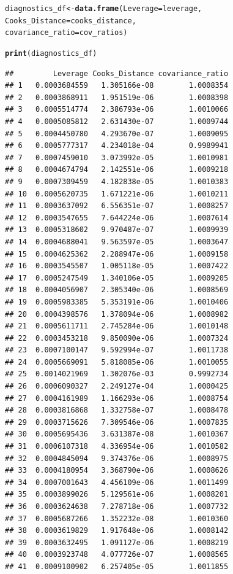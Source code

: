 \documentclass{article}\usepackage[]{graphicx}\usepackage[]{xcolor}
\makeatletter
\newcommand{\hlstd}[1]{\textcolor[rgb]{0.345,0.345,0.345}{#1}}%
\newcommand{\hlkwb}[1]{\textcolor[rgb]{0.69,0.353,0.396}{#1}}%
\newcommand{\hlkwc}[1]{\textcolor[rgb]{0.333,0.667,0.333}{#1}}%
\newcommand{\hlkwd}[1]{\textcolor[rgb]{0.737,0.353,0.396}{\textbf{#1}}}%
\newenvironment{kframe}{%
 \def\at@end@of@kframe{}%
 \ifinner\ifhmode%
  \def\at@end@of@kframe{\end{minipage}}%
  \begin{minipage}{\columnwidth}%
 \fi\fi%
 \def\FrameCommand##1{\hskip\@totalleftmargin \hskip-\fboxsep
 \colorbox{shadecolor}{##1}\hskip-\fboxsep
     \hskip-\linewidth \hskip-\@totalleftmargin \hskip\columnwidth}%
 \MakeFramed {\advance\hsize-\width
   \@totalleftmargin\z@ \linewidth\hsize
   \@setminipage}}%
 {\par\unskip\endMakeFramed%
 \at@end@of@kframe}
\newenvironment{knitrout}{}{} %
\makeatother
\begin{document}
\begin{knitrout}
\begin{kframe}
\begin{alltt}
\hlstd{diagnostics_df} \hlkwb{<-} \hlkwd{data.frame}\hlstd{(}\hlkwc{Leverage} \hlstd{= leverage,}
                             \hlkwc{Cooks_Distance} \hlstd{= cooks_distance,}
                             \hlkwc{covariance_ratio} \hlstd{= cov_ratios)}

\hlkwd{print}\hlstd{(diagnostics_df)}
\end{alltt}
\begin{verbatim}
##         Leverage Cooks_Distance covariance_ratio
## 1   0.0003684559   1.305166e-08        1.0008354
## 2   0.0003868911   1.951519e-06        1.0008398
## 3   0.0005514774   2.386793e-06        1.0010066
## 4   0.0005085812   2.631430e-07        1.0009744
## 5   0.0004450780   4.293670e-07        1.0009095
## 6   0.0005777317   4.234018e-04        0.9989941
## 7   0.0007459010   3.073992e-05        1.0010981
## 8   0.0004674794   2.142551e-06        1.0009218
## 9   0.0007309459   4.182838e-05        1.0010383
## 10  0.0005620735   1.671221e-06        1.0010211
## 11  0.0003637092   6.556351e-07        1.0008257
## 12  0.0003547655   7.644224e-06        1.0007614
## 13  0.0005318602   9.970487e-07        1.0009939
## 14  0.0004688041   9.563597e-05        1.0003647
## 15  0.0004625362   2.288947e-06        1.0009158
## 16  0.0003545507   1.005118e-05        1.0007422
## 17  0.0005247549   1.340106e-05        1.0009205
## 18  0.0004056907   2.305340e-06        1.0008569
## 19  0.0005983385   5.353191e-06        1.0010406
## 20  0.0004398576   1.378094e-06        1.0008982
## 21  0.0005611711   2.745284e-06        1.0010148
## 22  0.0003453218   9.850090e-06        1.0007324
## 23  0.0007100147   9.592994e-07        1.0011738
## 24  0.0005669091   5.818085e-06        1.0010055
## 25  0.0014021969   1.302076e-03        0.9992734
## 26  0.0006090327   2.249127e-04        1.0000425
## 27  0.0004161989   1.166293e-06        1.0008754
## 28  0.0003816868   1.332758e-07        1.0008478
## 29  0.0003715626   7.309546e-06        1.0007835
## 30  0.0005695436   3.631387e-08        1.0010367
## 31  0.0006107318   4.336954e-06        1.0010582
## 32  0.0004845094   9.374376e-06        1.0008975
## 33  0.0004180954   3.368790e-06        1.0008626
## 34  0.0007001643   4.456109e-06        1.0011499
## 35  0.0003899026   5.129561e-06        1.0008201
## 36  0.0003624638   7.278718e-06        1.0007732
## 37  0.0005687266   1.352232e-08        1.0010360
## 38  0.0003619829   1.917648e-06        1.0008142
## 39  0.0003632495   1.091127e-06        1.0008219
## 40  0.0003923748   4.077726e-07        1.0008565
## 41  0.0009100902   6.257405e-05        1.0011855

\end{verbatim}
\end{kframe}
\end{knitrout}
\end{document}

